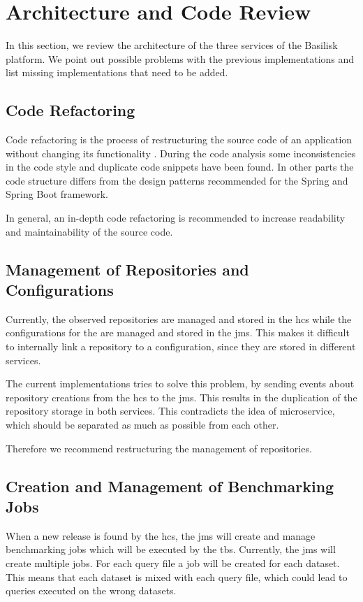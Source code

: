 \section{Architecture and Code Review}
\label{sec:architecture_review}

In this section, we review the architecture of the three services of the Basilisk platform.
We point out possible problems with the previous implementations and list missing implementations that need to be added.


\subsection{Code Refactoring}
\label{sec:code_refactor}
Code refactoring is the process of restructuring the source code of an application without changing its functionality \cite{fowlerRefactoringImprovingDesign2019a}.
During the code analysis some inconsistencies in the code style and duplicate code snippets have been found.
In other parts the code structure differs from the design patterns recommended for the Spring and Spring Boot framework.

In general, an in-depth code refactoring is recommended to increase readability and maintainability of the source code. 


\subsection{Management of Repositories and Configurations}
\label{sec:management_repo_config}
Currently, the observed repositories are managed and stored in the \ac{hcs} while the configurations for the \tsp{} are managed and stored in the \ac{jms}.
This makes it difficult to internally link a repository to a \ts{} configuration, since they are stored in different services.

The current implementations tries to solve this problem, by sending events about repository creations from the \ac{hcs} to the \ac{jms}.
This results in the duplication of the repository storage in both services.
This contradicts the idea of microservice, which should be separated as much as possible from each other.

Therefore we recommend restructuring the management of repositories.


\subsection{Creation and Management of Benchmarking Jobs}
\label{sec:creation_of_benchmark_jobs}
When a new release is found by the \ac{hcs}, the \acl{jms} will create and manage benchmarking jobs which will be executed by the \ac{tbs}.
Currently, the \ac{jms} will create multiple jobs.
For each query file a job will be created for each dataset.
This means that each dataset is mixed with each query file, which could lead to queries executed on the wrong datasets.

